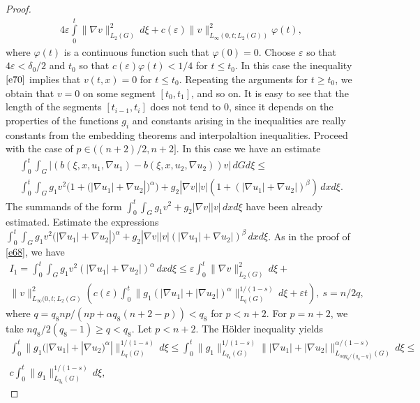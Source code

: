 \documentclass{article}
\theoremstyle{plain}
\begin{document}
\begin{proof}
\begin{multline}
4\varepsilon \int\limits_0^t \|\nabla v\|_{L_{2}(G)}^{2}\,d\xi+ c(\varepsilon)\|v\|_{L_{\infty}(0,t;L_2(G))}^{2}\varphi(t),
\end{multline}   
where $\varphi(t)$ is a continuous function such that  $\varphi(0)=0$. Choose $\varepsilon$ so that  $4\varepsilon<\delta_0/2$ and $t_0$ so that 
 $ c(\varepsilon)\varphi(t)<1/4$ for $t\leq t_0$. In this case the inequality  $\eqref{e70}$ implies that  $v(t,x)=0$  for $t\leq t_0$. 
Repeating the arguments for  $t\geq t_0$,  we obtain that  $v=0$ on some segment $[t_0,t_1]$, and so on.  It is easy to see that the length of the segments
   $[t_{i-1},t_i]$ does not tend to 0, since it depends on 
  the properties of the functions  $g_i$ and constants arising in the inequalities are really constants from the embedding theorems and interpolaltion inequalities.
  Proceed with the case of  $p\in ((n+2)/2,n+2]$. 
  In this case we have an estimate 
  \begin{multline}\label{e71}
 \int_0^t\int_G|(b(\xi,x,u_1,\nabla u_1)-b(\xi,x,u_2,\nabla u_2))v|\,dGd\xi\leq  \\
 \int_0^t\int_G  g_1 v^2 (1+(|\nabla u_1|+\nabla u_2|)^\alpha) +g_2|\nabla v| |v| (1+ (|\nabla u_1|+\nabla u_2|)^\beta)\,dxd\xi.
 \end{multline} 
The summands  of the form  $\int_0^t\int_G  g_1 v^2 + g_2|\nabla v| |v|\,dxd\xi$ have been already estimated. Estimate the expressions 
$\int_0^t\int_G  g_1 v^2(|\nabla u_1|+\nabla u_2|)^\alpha +g_2|\nabla v| |v| (|\nabla u_1|+\nabla u_2|)^\beta\,dxd\xi$. As in the proof of 
\eqref{e68}, we have 
  \begin{multline}\label{e72}
I_1=\int_0^t\int_G  g_1 v^2(|\nabla u_1|+\nabla u_2|)^\alpha \,dxd\xi\leq 
 \varepsilon \int_0^t \|\nabla v\|_{L_{2}(G)}^{2}\,d\xi+\\  \|v\|_{L_{\infty}(0,t;L_2(G)}^{2}(c(\varepsilon)\int_0^t \|g_1(|\nabla u_1|+|\nabla u_2|)^\alpha\|_{L_{q}(G)}^{1/(1-s)}\,d\xi +\varepsilon t),\ s=n/2q,
\end{multline} 
where $q=q_8np/(np+\alpha q_8(n+2-p))< q_8$ for $p<n+2$. For $p=n+2$, we take $nq_8/2(q_8-1)\geq q<q_8$.  Let  $p<n+2$. The H\"{o}lder inequality 
yields 
  \begin{multline}\label{e73}
\int_0^t \|g_1(|\nabla u_1|+|\nabla u_2)^\alpha|\|_{L_{q}(G)}^{1/(1-s)}\,d\xi \leq \int_0^t \|g_1\|_{L_{q_8}(G)}^{1/(1-s)}
\||\nabla u_1|+|\nabla u_2|\|_{L_{\alpha qq_8/(q_8-q)}(G)}^{\alpha/(1-s)}\,d\xi\leq \\ c \int_0^t \|g_1\|_{L_{q_8}(G)}^{1/(1-s)}\,d\xi,
\end{multline} 

\end{proof}
\end{document}
